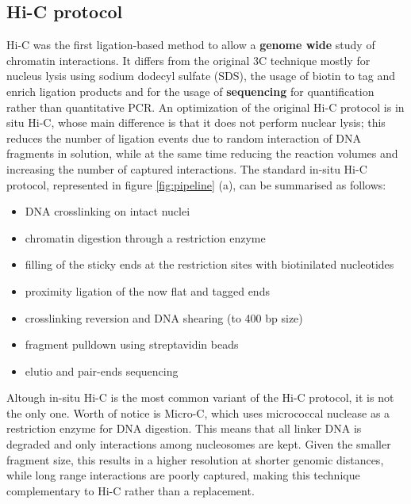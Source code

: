 \subsection{Hi-C protocol}
Hi-C was the first ligation-based method to allow a \textbf{genome wide} study of chromatin interactions. It differs from the original 3C technique mostly for nucleus lysis using sodium dodecyl sulfate (SDS), the usage of biotin to tag and enrich ligation products and for the usage of \textbf{sequencing} for quantification rather than quantitative PCR\cite{hicoriginal2009}. An optimization of the original Hi-C protocol is in situ Hi-C, whose main difference is that it does not perform nuclear lysis; this reduces the number of ligation events due to random interaction of DNA fragments in solution, while at the same time reducing the reaction volumes and increasing the number of captured interactions\cite{insituhic2014}. The standard in-situ Hi-C protocol, represented in figure \ref{fig:pipeline} (a), can be summarised as follows:

\begin{itemize}\tightlist
  \item DNA crosslinking on intact nuclei
  \item chromatin digestion through a restriction enzyme
  \item filling of the sticky ends at the restriction sites with biotinilated nucleotides
  \item proximity ligation of the now flat and tagged ends
  \item crosslinking reversion and DNA shearing (to 400 bp size)
  \item fragment pulldown using streptavidin beads
  \item elutio and pair-ends sequencing
\end{itemize}
 
Altough in-situ Hi-C is the most common variant of the Hi-C protocol, it is not the only one. Worth of notice is Micro-C, which uses micrococcal nuclease as a restriction enzyme for DNA digestion. This means that all linker DNA is degraded and only interactions among nucleosomes are kept. Given the smaller fragment size, this results in a higher resolution at shorter genomic distances, while long range interactions are poorly captured, making this technique complementary to Hi-C rather than a replacement\cite{microc2015}.

